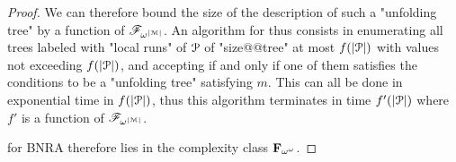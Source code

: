 \begin{proof}
	We can therefore bound the size of the description of such a "unfolding tree" by a function of $\mathscr{F}_{\omega^{|\mathcal{M}|}}$.
	An algorithm for \COVER thus consists in enumerating all trees labeled with "local runs" of $\mathcal{P}$ of "size@@tree" at most $f(|\mathcal{P}|)$ with values not exceeding $f(|\mathcal{P}|)$, and accepting if and only if one of them satisfies the conditions to be a "unfolding tree" satisfying $m$.
	This can all be done in exponential time in $f(|\mathcal{P}|)$, thus this algorithm terminates in time $f'(|\mathcal{P}|)$ where $f'$ is a function of $\mathscr{F}_{\omega^{|\mathcal{M}|}}$.
	
	\COVER for BNRA therefore lies in the complexity class $\mathbf{F}_{\omega^\omega}$.
\end{proof}

